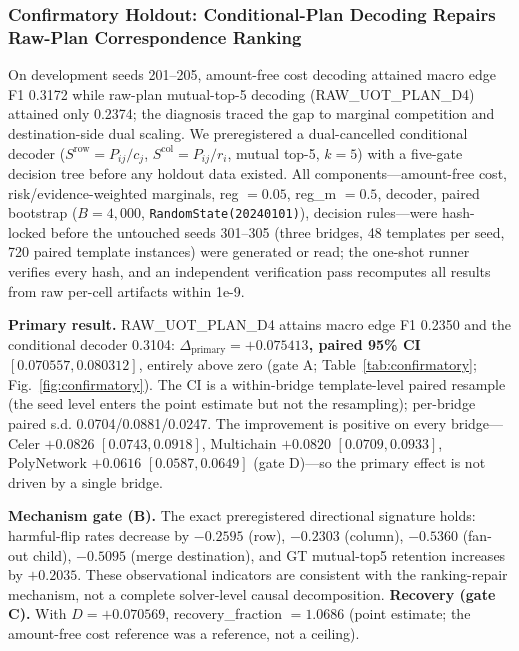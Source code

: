 \subsubsection{Confirmatory Holdout: Conditional-Plan Decoding Repairs Raw-Plan Correspondence Ranking}
\label{sec:confirmatory}

On development seeds 201--205, amount-free cost decoding attained macro edge F1 0.3172 while raw-plan mutual-top-5 decoding (RAW\_UOT\_PLAN\_D4) attained only 0.2374; the diagnosis traced the gap to marginal competition and destination-side dual scaling. We preregistered a dual-cancelled conditional decoder ($S^{\mathrm{row}}=P_{ij}/c_j$, $S^{\mathrm{col}}=P_{ij}/r_i$, mutual top-5, $k{=}5$) with a five-gate decision tree before any holdout data existed. All components---amount-free cost, risk/evidence-weighted marginals, reg $=0.05$, reg\_m $=0.5$, decoder, paired bootstrap ($B=4{,}000$, \texttt{RandomState(20240101)}), decision rules---were hash-locked before the untouched seeds 301--305 (three bridges, 48 templates per seed, 720 paired template instances) were generated or read; the one-shot runner verifies every hash, and an independent verification pass recomputes all results from raw per-cell artifacts within 1e-9.

\textbf{Primary result.} RAW\_UOT\_PLAN\_D4 attains macro edge F1 0.2350 and the conditional decoder 0.3104: \textbf{$\Delta_{\mathrm{primary}}=+0.075413$, paired 95\% CI $[0.070557,0.080312]$}, entirely above zero (gate A; Table~\ref{tab:confirmatory}; Fig.~\ref{fig:confirmatory}). The CI is a within-bridge template-level paired resample (the seed level enters the point estimate but not the resampling); per-bridge paired s.d. 0.0704/0.0881/0.0247. The improvement is positive on every bridge---Celer $+0.0826$ $[0.0743,0.0918]$, Multichain $+0.0820$ $[0.0709,0.0933]$, PolyNetwork $+0.0616$ $[0.0587,0.0649]$ (gate D)---so the primary effect is not driven by a single bridge.

\textbf{Mechanism gate (B).} The exact preregistered directional signature holds: harmful-flip rates decrease by $-0.2595$ (row), $-0.2303$ (column), $-0.5360$ (fan-out child), $-0.5095$ (merge destination), and GT mutual-top5 retention increases by $+0.2035$. These observational indicators are consistent with the ranking-repair mechanism, not a complete solver-level causal decomposition. \textbf{Recovery (gate C).} With $D=+0.070569$, recovery\_fraction $=1.0686$ (point estimate; the amount-free cost reference was a reference, not a ceiling).

